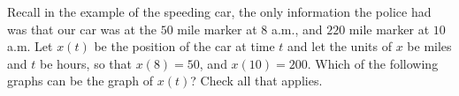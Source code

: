 \documentclass[pdftex, brazil, 12pt, twoside]{article}
\begin{document}
\begin{Exercise}[title={Time-position graph of the speeding car}]
  \noindent Recall in the example of the speeding car, the only information the
  police had was that our car was at the $50$ mile marker at $8$ a.m., and $220$
  mile marker at $10$ a.m. Let $x(t)$ be the position of the car at time $t$
  and let the units of $x$ be miles and $t$ be hours, so that $x(8) = 50$, and
  $x(10) = 200$. Which of the following graphs can be the graph of $x(t)$? Check all that applies.
  \begin{figure}[H]
    \begin{center}
      \label{fig:mvt-speed-1}
    \end{center}
  \end{figure}
\end{Exercise}
\end{document}
